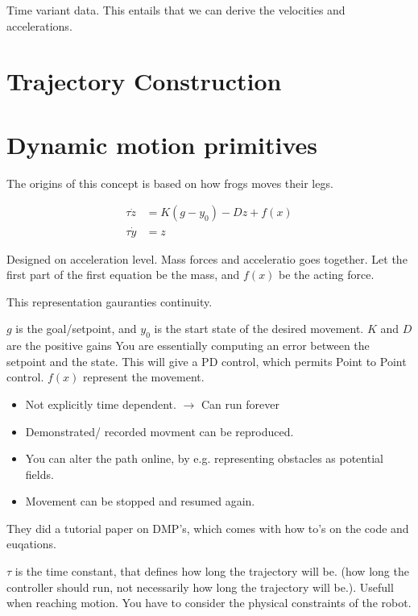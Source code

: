 \documentclass[a4paper]{article}
\begin{document}
Time variant data. This entails that we can derive the velocities and accelerations.

\section{Trajectory Construction}



\section{Dynamic motion primitives}
The origins of this concept is based on how frogs moves their legs.

\begin{align}
 \tau \dot{z} &=  K (g - y_0) - Dz + f(x)\\
 \tau \dot{y} &= z 
\end{align}

Designed on acceleration level.
Mass forces and acceleratio goes together. Let the first part of the first equation be the mass, and $ f(x) $ be the acting force.

This representation gauranties continuity. 

$ g $ is the goal/setpoint, and $ y_0 $ is the start state of the desired movement. $ K $ and $ D $ are the positive gains
You are essentially computing an error between the setpoint and the state. This will give a PD control, which permits Point to Point control.
$ f(x) $ represent the movement.

\vspace{5pt}

\begin{itemize}
	\item Not explicitly time dependent. $ \rightarrow $ Can run forever
	\item Demonstrated/ recorded movment can be reproduced.
	\item You can alter the path online, by e.g. representing obstacles as potential fields.
	\item Movement can be stopped and resumed again.
\end{itemize}

They did a tutorial paper on DMP's, which comes with how to's on the code and euqations.


$ \tau $ is the time constant, that defines how long the trajectory will be. (how long the controller should run, not necessarily how long the trajectory will be.). Usefull when reaching motion. You have to consider the physical constraints of the robot.
\end{document}
